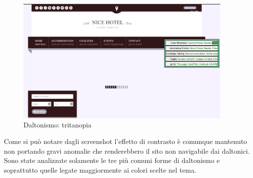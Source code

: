 \documentclass[a4paper,12pt,hidelinks]{report}
\begin{document}
\begin{figure}[h!]%
  \includegraphics[width=0.95\textwidth,keepaspectratio=true]{img/daltonismoTritanopia}
  \centering
  \caption{Daltonismo: tritanopia}%
  \label{fig:daltonismoTritanopia}%
\end{figure}
Come si può notare dagli screenshot l'effetto di contrasto è comunque mantenuto non portando gravi anomalie che renderebbero il sito non navigabile dai daltonici. 
\\Sono state analizzate solamente le tre più comuni forme di daltonismo e soprattutto quelle legate maggiormente ai colori scelte nel tema.
\end{document}
